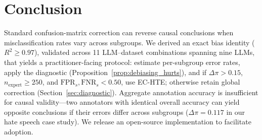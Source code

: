 \section{Conclusion}\label{sec:conclusion}

Standard confusion-matrix correction can reverse causal conclusions when misclassification rates vary across subgroups.
We derived an exact bias identity ($R^2 \geq 0.97$), validated across 11 LLM--dataset combinations spanning nine LLMs, that yields a practitioner-facing protocol: estimate per-subgroup error rates, apply the diagnostic (Proposition~\ref{prop:debiasing_hurts}), and if $\Delta\pi > 0.15$, $n_{\text{expert}} \geq 250$, and $\mathrm{FPR}_s, \mathrm{FNR}_s < 0.50$, use EC-HTE; otherwise retain global correction (Section~\ref{sec:diagnostic}).
Aggregate annotation accuracy is insufficient for causal validity---two annotators with identical overall accuracy can yield opposite conclusions if their errors differ across subgroups ($\Delta\pi = 0.117$ in our hate speech case study).
We release an open-source implementation to facilitate adoption.